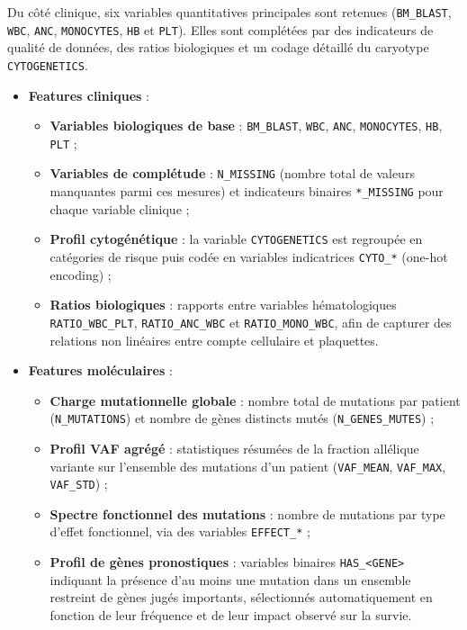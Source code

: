 \documentclass[12pt,a4paper]{article}
\begin{document}
Du côté clinique, six variables quantitatives principales sont retenues (\texttt{BM\_BLAST}, \texttt{WBC}, \texttt{ANC}, \texttt{MONOCYTES}, \texttt{HB} et \texttt{PLT}). Elles sont complétées par des indicateurs de qualité de données, des ratios biologiques et un codage détaillé du caryotype \texttt{CYTOGENETICS}.
\begin{itemize}[label=\large$\bullet$]
    \item \textbf{Features cliniques} :
    \begin{itemize}[label=\small$\circ$]
        \item \textbf{Variables biologiques de base} : \texttt{BM\_BLAST}, \texttt{WBC}, \texttt{ANC}, \texttt{MONOCYTES}, \texttt{HB}, \texttt{PLT} ;
        \item \textbf{Variables de complétude} : \texttt{N\_MISSING} (nombre total de valeurs manquantes parmi ces mesures) et indicateurs binaires \texttt{*\_MISSING} pour chaque variable clinique ;
        \item \textbf{Profil cytogénétique} : la variable \texttt{CYTOGENETICS} est regroupée en catégories de risque puis codée en variables indicatrices \texttt{CYTO\_*} (one-hot encoding) ;
        \item \textbf{Ratios biologiques} : rapports entre variables hématologiques \texttt{RATIO\_WBC\_PLT}, \texttt{RATIO\_ANC\_WBC} et \texttt{RATIO\_MONO\_WBC}, afin de capturer des relations non linéaires entre compte cellulaire et plaquettes.
    \end{itemize}

    \item \textbf{Features moléculaires} :
    \begin{itemize}[label=\small$\circ$]
        \item \textbf{Charge mutationnelle globale} : nombre total de mutations par patient (\texttt{N\_MUTATIONS}) et nombre de gènes distincts mutés (\texttt{N\_GENES\_MUTES}) ;
        \item \textbf{Profil VAF agrégé} : statistiques résumées de la fraction allélique variante sur l’ensemble des mutations d’un patient (\texttt{VAF\_MEAN}, \texttt{VAF\_MAX}, \texttt{VAF\_STD}) ;
        \item \textbf{Spectre fonctionnel des mutations} : nombre de mutations par type d’effet fonctionnel, via des variables \texttt{EFFECT\_*} ;
        \item \textbf{Profil de gènes pronostiques} : variables binaires \texttt{HAS\_<GENE>} indiquant la présence d’au moins une mutation dans un ensemble restreint de gènes jugés importants, sélectionnés automatiquement en fonction de leur fréquence et de leur impact observé sur la survie.
    \end{itemize}
\end{itemize}
\end{document}
